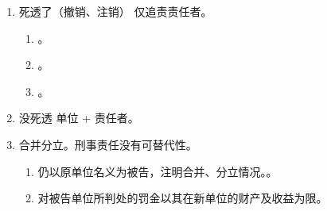 \begin{enumerate}
\begin{enumerate}
          \item 死透了（撤销、注销） \yjt 仅追责责任者。
                \begin{enumerate}
                  \item {}。
                  \item {}。
                  \item {}。
                \end{enumerate}
          \item 没死透 \yjt 单位 + 责任者。
          \item 合并分立。刑事责任没有可替代性。
                \begin{enumerate}
                  \item 仍以原单位名义为被告，注明合并、分立情况。。
                  \item 对被告单位所判处的罚金以其在新单位的财产及收益为限。
                \end{enumerate}
        \end{enumerate}
\end{enumerate}
